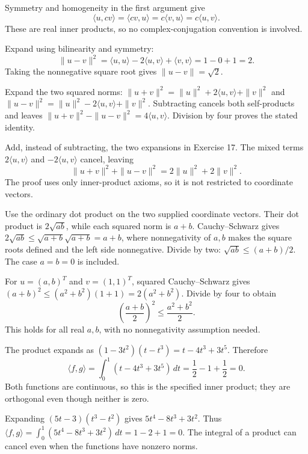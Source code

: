 Symmetry and homogeneity in the first argument give
\[
 \langle u,cv\rangle=\langle cv,u\rangle
 =c\langle v,u\rangle=c\langle u,v\rangle.
\]
These are real inner products, so no complex-conjugation convention is involved.

Expand using bilinearity and symmetry:
\[
 \|u-v\|^2=\langle u,u\rangle-2\langle u,v\rangle+\langle v,v\rangle
 =1-0+1=2.
\]
Taking the nonnegative square root gives $\boxed{\|u-v\|=\sqrt2}$.

Expand the two squared norms:
$\|u+v\|^2=\|u\|^2+2\langle u,v\rangle+\|v\|^2$ and
$\|u-v\|^2=\|u\|^2-2\langle u,v\rangle+\|v\|^2$.
Subtracting cancels both self-products and leaves
$\|u+v\|^2-\|u-v\|^2=4\langle u,v\rangle$.
Division by four proves the stated identity.

Add, instead of subtracting, the two expansions in Exercise 17.
The mixed terms $2\langle u,v\rangle$ and $-2\langle u,v\rangle$
cancel, leaving
\[
 \boxed{\|u+v\|^2+\|u-v\|^2=2\|u\|^2+2\|v\|^2}.
\]
The proof uses only inner-product axioms, so it is not restricted to coordinate vectors.

Use the ordinary dot product on the two supplied coordinate vectors.
Their dot product is $2\sqrt{ab}$, while each squared norm is
$a+b$. Cauchy--Schwarz gives
$2\sqrt{ab}\le\sqrt{a+b}\sqrt{a+b}=a+b$,
where nonnegativity of $a,b$ makes the square roots defined and the
left side nonnegative. Divide by two:
$\boxed{\sqrt{ab}\le(a+b)/2}$. The case $a=b=0$ is included.

For $u=(a,b)^T$ and $v=(1,1)^T$, squared Cauchy--Schwarz gives
$(a+b)^2\le(a^2+b^2)(1+1)=2(a^2+b^2)$.
Divide by four to obtain
\[
 \boxed{\left(\frac{a+b}{2}\right)^2\le\frac{a^2+b^2}{2}}.
\]
This holds for all real $a,b$, with no nonnegativity assumption needed.

The product expands as
$(1-3t^2)(t-t^3)=t-4t^3+3t^5$.
Therefore
\[
 \langle f,g\rangle=\int_0^1(t-4t^3+3t^5)\,dt
 =\frac12-1+\frac12=\boxed0.
\]
Both functions are continuous, so this is the specified inner product;
they are orthogonal even though neither is zero.

Expanding $(5t-3)(t^3-t^2)$ gives $5t^4-8t^3+3t^2$.
Thus
$\langle f,g\rangle=\int_0^1(5t^4-8t^3+3t^2)\,dt
=1-2+1=\boxed0$.
The integral of a product can cancel even when the functions have nonzero norms.

